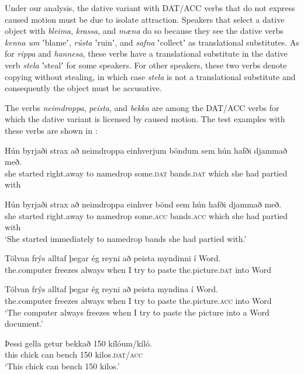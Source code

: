 \documentclass[output=paper,modfonts,nonflat,colorlinks,citecolor=brown]{langsci/langscibook}
\begin{document}
Under our analysis, the dative variant with DAT/ACC verbs that do not express caused motion must be due to isolate attraction. Speakers that select a dative object with \textit{bleima}, \textit{krassa}, and \textit{mæna} do so because they see the dative verbs \textit{kenna} \textit{um} ʽblameʼ, \textit{rústa} ʽruinʼ, and \textit{safna} ʽcollectʼ as translational substitutes. As for \textit{rippa} and \textit{hannesa}, these verbs have a translational substitute in the dative verb \textit{stela} ʽstealʼ for some speakers. For other speakers, these two verbs denote copying without stealing, in which case \textit{stela} is not a translational substitute and consequently the object must be accusative.

The verbs \textit{neimdroppa}, \textit{peista}, and \textit{bekka} are among the DAT/ACC verbs for which the dative variant is licensed by caused motion. The test examples with these verbs are shown in :


\ea%
\label{ex:jonsson:7}
\ea\label{ex:jonsson:7a}
\gll  Hún  byrjaði  strax  að  neimdroppa  einhverjum  böndum  sem  hún  hafði  djammað  með.\\
   she  started  right.away  to  namedrop  some.\textsc{dat}  bands.\textsc{dat}  which  she  had  partied  with\\
\glt { }


\ex\label{ex:jonsson:7b}
\gll   Hún  byrjaði  strax  að  neimdroppa  einhver  bönd  sem  hún  hafði  djammað  með.\\
 she  started  right.away  to  namedrop  some.\textsc{acc}  bands.\textsc{acc}  which  she  had  partied  with\\
 \glt `She started immediately to namedrop bands she had partied with.'


\ex\label{ex:jonsson:7c}
\gll   Tölvan  frýs  alltaf  þegar  ég  reyni  að  peista  myndinni  í  Word.  \\
 the.computer  freezes  always  when  I  try  to  paste  the.picture.\textsc{dat}  into  Word  \\
\glt { }

\ex\label{ex:jonsson:7d}
\gll   Tölvan  frýs  alltaf  þegar  ég  reyni  að  peista  myndina  í  Word.\\
 the.computer  freezes  always  when  I  try  to  paste  the.picture.\textsc{acc}  into  Word\\
\glt `The computer always freezes when I try to paste the picture into a Word document.'


\ex\label{ex:jonsson:7e}
\gll   Þessi  gella  getur  bekkað  150  kílóum/kíló.\\
 this  chick  can  bench  150  kilos.\textsc{dat/acc}\\
\glt `This chick can bench 150 kilos.'
\z
\z
\end{document}
